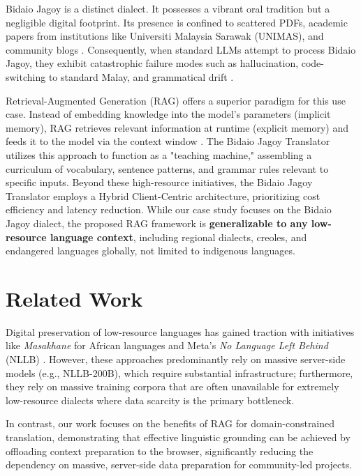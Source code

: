 \documentclass[12pt]{article}
\begin{document}
Bidaio Jagoy is a distinct dialect. It possesses a vibrant oral tradition but a negligible digital footprint. Its presence is confined to scattered PDFs, academic papers from institutions like Universiti Malaysia Sarawak (UNIMAS), and community blogs \cite{unimas_repo}. Consequently, when standard LLMs attempt to process Bidaio Jagoy, they exhibit catastrophic failure modes such as hallucination, code-switching to standard Malay, and grammatical drift \cite{scispace_intensifiers}.

Retrieval-Augmented Generation (RAG) offers a superior paradigm for this use case. Instead of embedding knowledge into the model's parameters (implicit memory), RAG retrieves relevant information at runtime (explicit memory) and feeds it to the model via the context window \cite{intersystems_rag}. The Bidaio Jagoy Translator utilizes this approach to function as a "teaching machine," assembling a curriculum of vocabulary, sentence patterns, and grammar rules relevant to specific inputs.
Beyond these high-resource initiatives, the Bidaio Jagoy Translator employs a Hybrid Client-Centric architecture, prioritizing cost efficiency and latency reduction. While our case study focuses on the Bidaio Jagoy dialect, the proposed RAG framework is \textbf{generalizable to any low-resource language context}, including regional dialects, creoles, and endangered languages globally, not limited to indigenous languages.

\section{Related Work}

Digital preservation of low-resource languages has gained traction with initiatives like \textit{Masakhane} for African languages \cite{nekoto2020participatory} and Meta's \textit{No Language Left Behind} (NLLB) \cite{nllb2022no}. However, these approaches predominantly rely on massive server-side models (e.g., NLLB-200B), which require substantial infrastructure; furthermore, they rely on massive training corpora that are often unavailable for extremely low-resource dialects where data scarcity is the primary bottleneck.

In contrast, our work focuses on the benefits of RAG for domain-constrained translation, demonstrating that effective linguistic grounding can be achieved by offloading context preparation to the browser, significantly reducing the dependency on massive, server-side data preparation for community-led projects.
\end{document}
